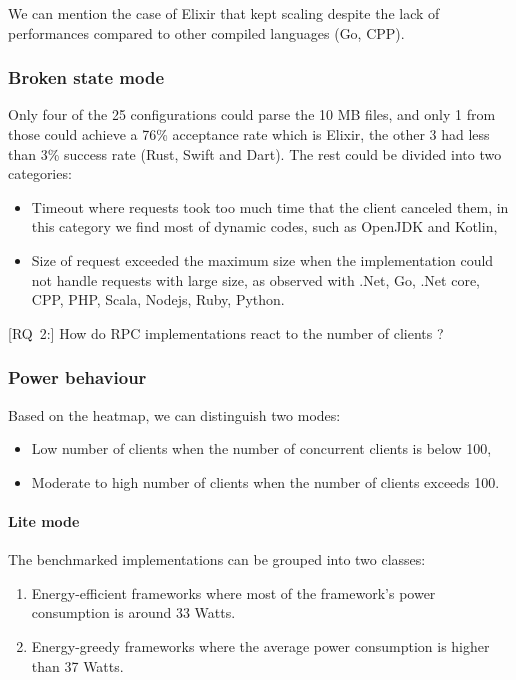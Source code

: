 We can mention the case of Elixir that kept scaling despite the lack of performances compared to other compiled languages (Go, CPP).

\subsubsection{Broken state mode }
Only four of the 25 configurations could parse the 10 MB files, and only 1 from those could achieve a 76\% acceptance rate which is Elixir, the other 3 had less than 3\% success rate (Rust, Swift and Dart).
The rest could be divided into two categories:
\begin{itemize}
    \item \textsf{Timeout} where requests took too much time that the client canceled them, in this category we find most of dynamic codes, such as OpenJDK and Kotlin,
    \item \textsf{Size of request} exceeded the maximum size when the implementation could not handle requests with large size, as observed with .Net, Go, .Net core, CPP, PHP, Scala, Nodejs, Ruby, Python.
\end{itemize}


[\textsc{RQ}~2:] How do RPC implementations react to the number of clients ?

\subsubsection{Power behaviour}
Based on the heatmap, we can distinguish two modes:
\begin{itemize}
    \item \textsf{Low number of clients} when the number of concurrent clients is below 100,
    \item \textsf{Moderate to high number of clients} when the number of clients exceeds 100.
\end{itemize}


\paragraph{Lite mode}
The benchmarked implementations can be grouped into two classes:
\begin{enumerate}
    \item \textsf{Energy-efficient frameworks} where most of the framework's power consumption is around 33 Watts.
    \item \textsf{Energy-greedy frameworks} where the average power consumption is higher than 37 Watts.
\end{enumerate}

